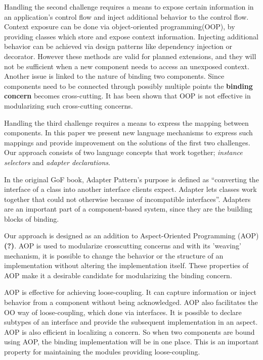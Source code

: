 \documentclass{llncs}
\begin{document}
Handling the second challenge requires a means to expose certain information in an
application's control flow and inject additional behavior to the control flow. Context exposure can be done via object-oriented programming(OOP), by providing classes which store and expose context information. Injecting additional behavior can be achieved via design patterns like dependency injection or decorator. However these methods are valid for planned extensions, and they will not be sufficient when a new component needs to access an unexposed context. Another issue is linked to the nature of binding two components. Since components need to be connected through possibly multiple points the \textbf{binding concern} becomes cross-cutting. It has been shown that OOP is not effective in modularizing such cross-cutting concerns.  

Handling the third challenge requires a means to express the mapping between components. In this paper we present new language mechanisms to express such mappings and provide improvement on the solutions of the first two challenges. Our approach consists of two language concepts that work together; \emph{instance selectors} and \emph{adapter declarations}. 

In the original GoF book, Adapter Pattern's purpose is defined as ``converting the interface of a class into another interface clients expect. Adapter lets classes work together that could not otherwise because of incompatible interfaces''. Adapters are an important part of a component-based system, since they are the building blocks of binding. 

Our approach is designed as an addition to Aspect-Oriented Programming (AOP)\textbf{(?)}. AOP is used to modularize crosscutting
concerns and with its 'weaving' mechanism, it is possible to change the behavior or the structure of an implementation without altering the
implementation itself. These properties of AOP make it a desirable candidate for modularizing the binding concern.

AOP is effective for achieving loose-coupling. It
can capture information or inject behavior from a component without being
acknowledged. AOP also facilitates the OO way of loose-coupling, which done via
interfaces. It is possible to declare subtypes of an interface and provide the
subsequent implementation in an aspect.  AOP is also efficient in localizing a concern. So when two components are bound using
AOP, the binding implementation will be in one place. This is an important
property for maintaining the modules providing loose-coupling. 
\end{document}
